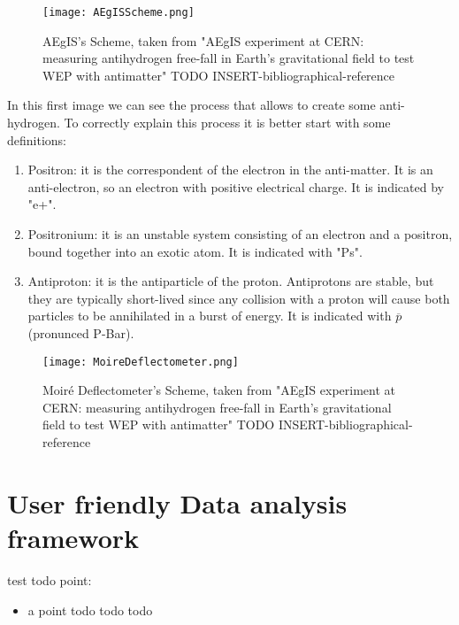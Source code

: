 \begin{figure}[H]
\centering
\texttt{[image: AEgISScheme.png]} 
\caption{AEgIS's Scheme, taken from "AEgIS experiment at CERN: measuring antihydrogen free-fall in Earth’s gravitational field to test WEP with antimatter" TODO INSERT-bibliographical-reference}
\end{figure}

In this first image we can see the process that allows to create some anti-hydrogen. To correctly explain this process it is better start with some definitions:


\begin{enumerate}

\item Positron: it is the correspondent of the electron in the anti-matter. It is an anti-electron, so an electron with positive electrical charge. It is indicated by "e+".

\item Positronium: it is an unstable system consisting of an electron and a positron, bound together into an exotic atom. It is indicated with "Ps".

\item Antiproton: it is the antiparticle of the proton. Antiprotons are stable, but they are typically short-lived since any collision with a proton will cause both particles to be annihilated in a burst of energy. It is indicated with $ \overline{p} $ (pronunced P-Bar).

\end{enumerate}


\begin{figure}[H]
\centering
\texttt{[image: MoireDeflectometer.png]} 
\caption{Moiré Deflectometer's Scheme, taken from "AEgIS experiment at CERN: measuring antihydrogen free-fall in Earth’s gravitational field to test WEP with antimatter" TODO INSERT-bibliographical-reference}
\end{figure}


\section{User friendly Data analysis framework}

test todo point:

\begin{itemize}
\item 
a point todo todo todo
\end{itemize}
